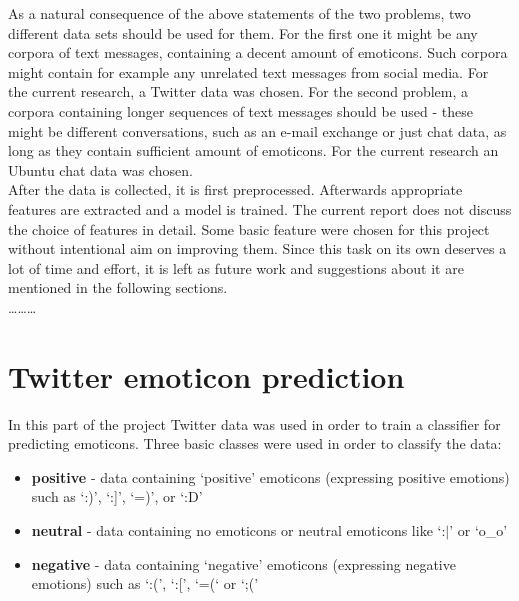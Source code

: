 \documentclass{article}
\begin{document}
\noindent As a natural consequence of the above statements of the two problems, two different data sets should be used for them. For the first one it might be any corpora of text messages, containing a decent amount of emoticons. Such corpora might contain for example any unrelated text messages from social media. For the current research, a Twitter data was chosen. For the second problem, a corpora containing longer sequences of text messages should be used - these might be different conversations, such as an e-mail exchange or just chat data, as long as they contain sufficient amount of emoticons. For the current research an Ubuntu chat data was chosen. \\

\noindent After the data is collected, it is first preprocessed. Afterwards appropriate features are extracted and a model is trained. The current report does not discuss the choice of features in detail. Some basic feature were chosen for this project without intentional aim on improving them. Since this task on its own deserves a lot of time and effort, it is left as future work and suggestions about it are mentioned in the following sections. \\

\ldots \ldots \ldots 




\pagebreak


\section{Twitter emoticon prediction}

In this part of the project Twitter data was used in order to train a classifier for predicting emoticons. Three basic classes were used in order to classify the data:

\begin{itemize}
\item \textbf{positive} - data containing `positive' emoticons (expressing positive emotions) such as `:)', `:]', `=)', or `:D'
\item \textbf{neutral} - data containing no emoticons or neutral emoticons like `:$\vert$' or `o\_o'
\item \textbf{negative} - data containing `negative' emoticons (expressing negative emotions) such as `:(', `:[', `=(` or `;(' 
\end{itemize}
\end{document}
